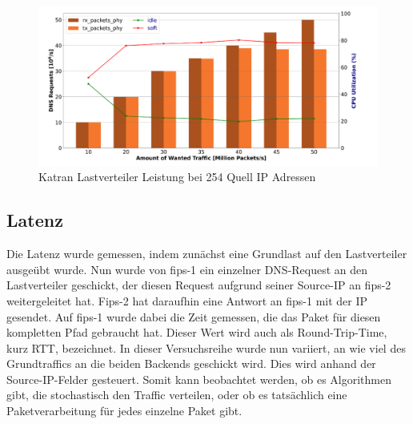 \begin{figure}
    \centering
    \includegraphics[width=1\linewidth]{images/katran_performance.png}
    \caption{Katran Lastverteiler Leistung bei 254 Quell IP Adressen \cite{ungrund}}
    \label{fig:enter-label}
\end{figure}
\subsection{Latenz}
Die Latenz wurde gemessen, indem zunächst eine Grundlast auf den Lastverteiler ausgeübt wurde. Nun wurde von fips-1 ein einzelner DNS-Request an den Lastverteiler geschickt, der diesen Request aufgrund seiner Source-IP an fips-2 weitergeleitet hat. Fips-2 hat daraufhin eine Antwort an fips-1 mit der IP gesendet. Auf fips-1 wurde dabei die Zeit gemessen, die das Paket für diesen kompletten Pfad gebraucht hat. Dieser Wert wird auch als Round-Trip-Time, kurz RTT, bezeichnet. In dieser Versuchsreihe wurde nun variiert, an wie viel des Grundtraffics an die beiden Backends geschickt wird. Dies wird anhand der Source-IP-Felder gesteuert. Somit kann beobachtet werden, ob es Algorithmen gibt, die stochastisch den Traffic verteilen, oder ob es tatsächlich eine Paketverarbeitung für jedes einzelne Paket gibt.
